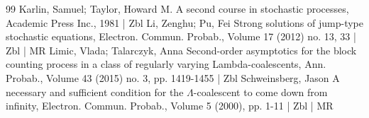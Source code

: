 \documentclass[10pt]{amsart}
\theoremstyle{definition}\newtheorem{defi}[theo]{Definition}\newtheorem{rema}[theo]{Remark}\newtheorem{exam}[theo]{Example}\newtheorem{exem}[theo]{Example}\newtheorem{nota}[theo]{Notation}
\begin{document}
\begin{thebibliography}{99}
 Karlin, Samuel; Taylor, Howard M. A second course in stochastic processes, Academic Press Inc., 1981 | Zbl
 Li, Zenghu; Pu, Fei Strong solutions of jump-type stochastic equations, Electron. Commun. Probab., Volume 17 (2012) no. 13, 33 | Zbl | MR
 Limic, Vlada; Talarczyk, Anna Second-order asymptotics for the block counting process in a class of regularly varying Lambda-coalescents, Ann. Probab., Volume 43 (2015) no. 3, pp. 1419-1455 | Zbl
 Schweinsberg, Jason A necessary and sufficient condition for the $\Lambda $-coalescent to come down from infinity, Electron. Commun. Probab., Volume 5 (2000), pp. 1-11 | Zbl | MR
\end{thebibliography}
\end{document}
